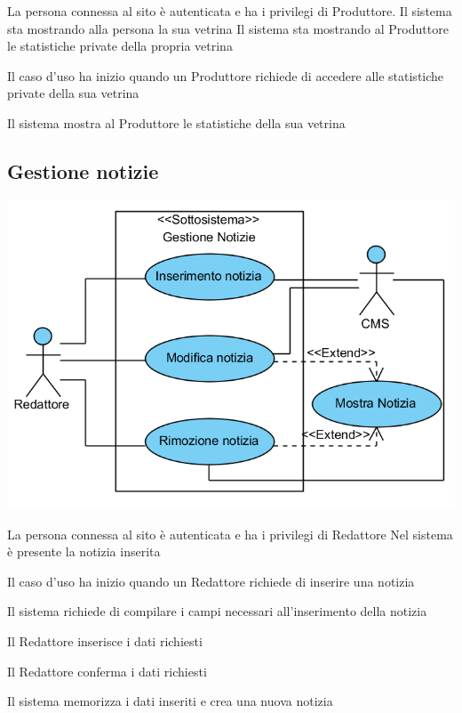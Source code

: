 
{}
{La persona connessa al sito è autenticata e ha i privilegi di Produttore. Il sistema sta mostrando alla persona la sua vetrina}
{Il sistema sta mostrando al Produttore le statistiche private della propria vetrina}
{\begin{enumCU}
		\item Il caso d'uso ha inizio quando un Produttore richiede di accedere alle statistiche private della sua vetrina
		\item Il sistema mostra al Produttore le statistiche della sua vetrina
	\end{enumCU}}

\subsection{Gestione notizie}
\begin{center}
   \includegraphics[width=\textwidth]{assets/visualParadigm/cu/GestioneNotizie}
\end{center}
%
{}
{La persona connessa al sito è autenticata e ha i privilegi di Redattore}
{Nel sistema è presente la notizia inserita}
{\begin{enumCU}
	\item Il caso d'uso ha inizio quando un Redattore richiede di inserire una notizia  
	\item Il sistema richiede di compilare i campi necessari all'inserimento della notizia
	\item Il Redattore inserisce i dati richiesti \label{cuinsnot:2}
	\item Il Redattore conferma i dati richiesti
	\item Il sistema memorizza i dati inseriti e crea una nuova notizia
\end{enumCU}}
